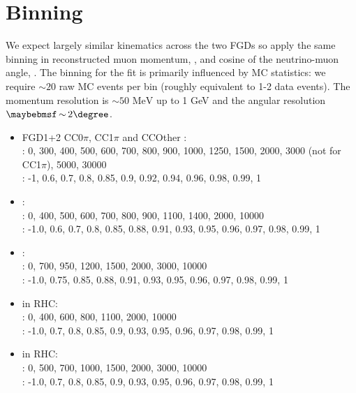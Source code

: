 \section{Binning}
We expect largely similar kinematics across the two FGDs so apply the same binning in reconstructed muon momentum, \pmu, and cosine of the neutrino-muon angle, \cosmu. The binning for the fit is primarily influenced by MC statistics: we require $\sim 20$ raw MC events per bin (roughly equivalent to 1-2 data events). The momentum resolution is $\sim50\text{ MeV}$ up to 1 GeV and the angular resolution $\sim 2\degree$.
\begin{itemize}
	\item FGD1+2  CC$0\pi$, CC1$\pi$ and CCOther \numu: \\
	\pmu: 0, 300, 400, 500, 600, 700, 800, 900, 1000, 1250, 1500, 2000, 3000 (not for CC1$\pi$), 5000, 30000\\
	\cosmu:  -1, 0.6, 0.7, 0.8, 0.85, 0.9, 0.92, 0.94, 0.96, 0.98, 0.99, 1
	
	\item {}: \\
	\pmu: 0, 400, 500, 600, 700, 800, 900, 1100, 1400, 2000, 10000\\
	\cosmu: -1.0, 0.6, 0.7, 0.8, 0.85, 0.88, 0.91, 0.93, 0.95, 0.96, 0.97, 0.98, 0.99, 1
	
	\item {}: \\
	\pmu: 0, 700, 950, 1200, 1500, 2000, 3000, 10000\\
	\cosmu: -1.0, 0.75, 0.85, 0.88, 0.91, 0.93, 0.95, 0.96, 0.97, 0.98, 0.99, 1
	
	\item {} in RHC: \\
	\pmu: 0, 400, 600, 800, 1100, 2000, 10000 \\
	\cosmu: -1.0, 0.7, 0.8, 0.85, 0.9, 0.93, 0.95, 0.96, 0.97, 0.98, 0.99, 1
	
	\item {} in RHC: \\
	\pmu: 0, 500, 700, 1000, 1500, 2000, 3000, 10000\\
	\cosmu: -1.0, 0.7, 0.8, 0.85, 0.9, 0.93, 0.95, 0.96, 0.97, 0.98, 0.99, 1
\end{itemize}

